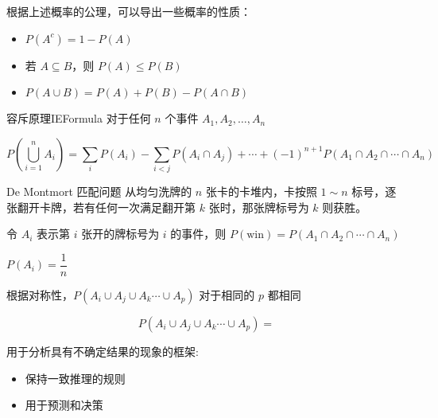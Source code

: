 根据上述概率的公理，可以导出一些概率的性质：

\begin{itemize}
    \item $P(A^c) = 1 - P(A)$
    \item 若 $A \subseteq B$，则 $P(A) \leq P(B)$
    \item $P(A \cup B) = P(A) + P(B) - P(A \cap B)$
\end{itemize}

\begin{theorem}{容斥原理}{IEFormula}
    对于任何 $n$ 个事件 $A_1, A_2, \dots, A_n$
    
    $$
    P\left(\bigcup_{i = 1}^{n} A_i\right) = \sum_i P(A_i) - \sum_{i < j} P(A_i \cap A_j) + \cdots + (-1)^{n + 1} P(A_1 \cap A_2 \cap \cdots \cap A_n)
    $$
\end{theorem}

\begin{example}{De Montmort 匹配问题}{}
    从均匀洗牌的 $n$ 张卡的卡堆内，卡按照 $1 \sim n$ 标号，逐张翻开卡牌，若有任何一次满足翻开第 $k$ 张时，那张牌标号为 $k$ 则获胜。
    
    令 $A_i$ 表示第 $i$ 张开的牌标号为 $i$ 的事件，则 $P(\text{win}) = P(A_1 \cap A_2 \cap \cdots \cap A_n)$
    
    $P(A_i) = \dfrac{1}{n}$
    
    根据对称性，$P(A_i \cup A_j \cup A_k \cdots \cup A_p)$ 对于相同的 $p$ 都相同
    
    $$
    P(A_i \cup A_j \cup A_k \cdots \cup A_p) = 
    $$
\end{example}

用于分析具有不确定结果的现象的框架:
\begin{itemize}
    \item 保持一致推理的规则
    \item 用于预测和决策
\end{itemize}

\begin{center}


\end{center}
